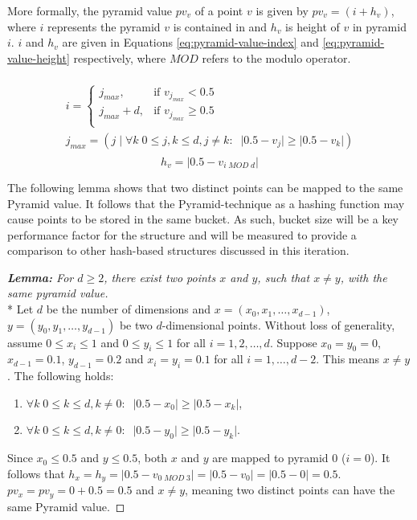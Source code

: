 \begin{figure}
		\label{fig:pyramid-tree-partition}
\end{figure}

More formally, the pyramid value $pv_v$ of a point $v$ is given by $pv_v = (i + h_v)$, where $i$ represents the pyramid $v$ is contained in and $h_v$ is height of $v$ in pyramid $i$. $i$ and $h_v$ are given in Equations \ref{eq:pyramid-value-index} and \ref{eq:pyramid-value-height} respectively, where $MOD$ refers to the modulo operator.

\begin{multline}\\
	i = \begin{cases}
		j_{max},         & \text{if }v_{j_{max}} < 0.5\\
		j_{max} + d,   & \text{if }v_{j_{max}} \geq 0.5\\
	\end{cases} \\
	j_{max} = \left( j \;|\; \forall k \; 0 \leq j,k \leq d, j \neq k: \;\; \lvert 0.5 - v_j \rvert \geq \lvert 0.5 - v_k \rvert \right) \\
	\label{eq:pyramid-value-index}
\end{multline}
\begin{equation}
	h_v = \lvert 0.5 - v_{i \; MOD \; d} \rvert
	\label{eq:pyramid-value-height}
\end{equation}

The following lemma shows that two distinct points can be mapped to the same Pyramid value. It follows that the Pyramid-technique as a hashing function may cause points to be stored in the same bucket. As such, bucket size will be a key performance factor for the structure and will be measured to provide a comparison to other hash-based structures discussed in this iteration.

\begin{proof}[\textbf{Lemma: } For $d \geq 2$, there exist two points $x$ and $y$, such that $x \neq y$, with the same pyramid value]\mbox{}\\*
Let $d$ be the number of dimensions and $x = (x_0, x_1, \dots, x_{d -1})$, $y = (y_0, y_1, \dots, y_{d - 1})$ be two $d$-dimensional points. Without loss of generality, assume $0 \leq x_i \leq 1$ and $0 \leq y_i \leq 1$ for all $i = 1, 2, \dots, d$. Suppose $x_0 = y_0 = 0$, $x_{d - 1} = 0.1$, $y_{d - 1} = 0.2$ and $x_i = y_i = 0.1$ for all $i = 1, \dots, {d - 2}$. This means $x \neq y$. The following holds:
\begin{enumerate}
	\item $\forall k \; 0 \leq k \leq d, k \neq 0: \;\; \lvert 0.5 - x_0 \rvert \geq \lvert 0.5 - x_k \rvert$,
	\item $\forall k \; 0 \leq k \leq d, k \neq 0: \;\; \lvert 0.5 - y_0 \rvert \geq \lvert 0.5 - y_k \rvert$.
\end{enumerate}
Since $x_0 \leq 0.5$ and $y \leq 0.5$, both $x$ and $y$ are mapped to pyramid 0 ($i = 0$). It follows that $h_x = h_y = \lvert 0.5 - v_{0 \; MOD \; 3} \rvert = \lvert 0.5 - v_{0} \rvert = \lvert 0.5 - 0 \rvert = 0.5$. $pv_x = pv_y = 0 + 0.5 = 0.5$ and $x \neq y$, meaning two distinct points can have the same Pyramid value.

\end{proof}

